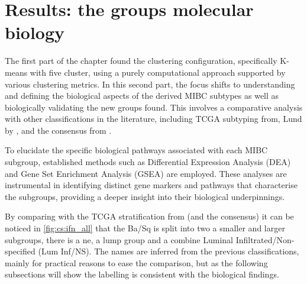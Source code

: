 \section{Results: the groups molecular biology} \label{s:cs:bio_interp}


The first part of the chapter found the clustering configuration, specifically K-means with five cluster, using a purely computational approach supported by various clustering metrics. In this second part, the focus shifts to understanding and defining the biological aspects of the derived MIBC subtypes as well as biologically validating the new groups found. This involves a comparative analysis with other classifications in the literature, including TCGA subtyping from\cite{Robertson2017-mg}, Lund by \citet{Marzouka2018-ge}, and the consensus from \citet{Kamoun2020-tj}.

To elucidate the specific biological pathways associated with each MIBC subgroup, established methods such as Differential Expression Analysis (DEA) and Gene Set Enrichment Analysis (GSEA) are employed. These analyses are instrumental in identifying distinct gene markers and pathways that characterise the subgroups, providing a deeper insight into their biological underpinnings.


By comparing with the TCGA stratification from \citet{Robertson2017-mg} (and the consensus) it can be noticed in \cref{fig:cs:ifn_all} that the Ba/Sq is split into two a smaller and larger subgroups, there is a \acrfull{ne}, a \acrfull{lump} group and a combine Luminal Infiltrated/Non-specified (Lum Inf/NS). The names are inferred from the previous classifications, mainly for practical reasons to ease the comparison, but as the following subsections will show the labelling is consistent with the biological findings.

